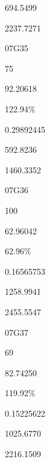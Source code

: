 \documentclass[a4paper]{article}
\begin{document}
{694.5499}

{2237.7271}

07G35

75

92.20618

{ 122.94\% }

0.29892445

{592.8236}

{1460.3352}

07G36

100

62.96042

{ 62.96\% }

0.16565753

{1258.9941}

{2455.5547}

07G37

69

82.74250

{ 119.92\% }

0.15225622

{1025.6770}

{2216.1509}
\end{document}
